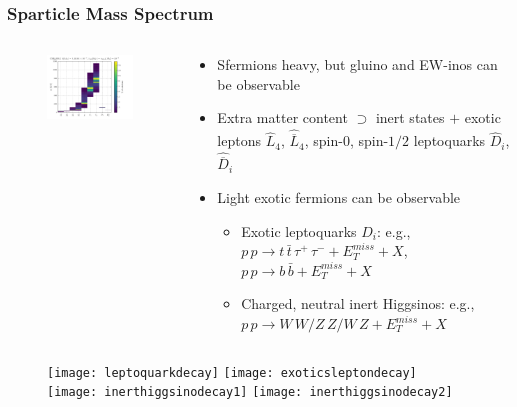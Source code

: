 \documentclass[10pt,aspectratio=169]{beamer}
\begin{document}
\begin{frame}
  \frametitle{Sparticle Mass Spectrum}
  \begin{columns}[t]
    \begin{column}{0.4\textwidth}
      \vspace{-30pt}
      \begin{figure}
        \begin{center}
          \includegraphics[width=6.5cm]{cse6ssm_300GeV_mueff_spectrum}
        \end{center}
      \end{figure}
    \end{column}
    \begin{column}{0.6\textwidth}
      \vspace{-10pt}
      \begin{itemize} \itemsep1em
      \item Sfermions heavy, but gluino and EW-inos
        can be observable
      \item Extra matter content $\supset$ inert states $+$ exotic leptons
        $\hat{L}_4$, $\hat{\overline{L}}_4$, spin-$0$, spin-$1/2$
        leptoquarks $\hat{D}_i$, $\hat{\overline{D}}_i$
      \item {\color{blue} Light exotic fermions can be observable}
        \begin{itemize} \itemsep0.8em
        \item Exotic leptoquarks $D_i$: e.g., $p\,p \to t\,\bar{t}
          \,\tau^+\,\tau^-+E_T^{miss}+X$,
          $p\,p \to b\,\bar{b} + E_T^{miss} + X$
        \item Charged, neutral inert Higgsinos: e.g., $p\,p\to W\,W / Z\,Z
          / W\,Z +E_T^{miss}+X$
        \end{itemize}
      \end{itemize}
    \end{column}
  \end{columns}
  \vspace{2pt}
  \begin{center}
    \begin{figure}
      \texttt{[image: leptoquarkdecay]}
      \hspace{40pt}
      \texttt{[image: exoticsleptondecay]}
      \hspace{40pt}
      \texttt{[image: inerthiggsinodecay1]}
      \hspace{40pt}
      \texttt{[image: inerthiggsinodecay2]}
    \end{figure}
  \end{center}
\end{frame}
\end{document}
